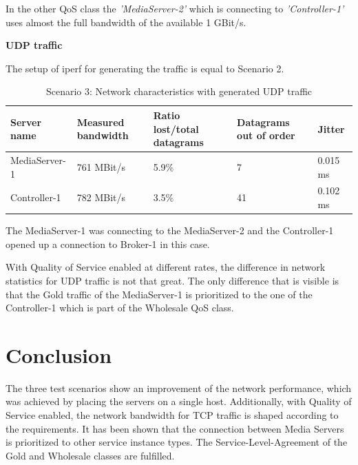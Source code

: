 In the other QoS class the \textit{'MediaServer-2'} which is connecting to \textit{'Controller-1'} uses almost the full bandwidth of the available 1 GBit/s.

\textbf{UDP traffic}

The setup of iperf for generating the traffic is equal to Scenario 2.

\begin{table}[H]
\centering

\begin{tabularx}{\textwidth}{ |X|X|X|X|X| }
\hline Server name & Measured bandwidth & Ratio lost/total datagrams & Datagrams out of order & Jitter \\ 
\hline MediaServer-1 & 761 MBit/s & 5.9\% & 7 & 0.015 ms\\ 
\hline Controller-1 & 782 MBit/s & 3.5\% & 41 & 0.102 ms \\ 
\hline 
\end{tabularx}

\caption{Scenario 3: Network characteristics with generated UDP traffic}
\end{table}

The MediaServer-1 was connecting to the MediaServer-2 and the Controller-1 opened up a connection to Broker-1 in this case.

With Quality of Service enabled at different rates, the difference in network statistics for UDP traffic is not that great. The only difference that is visible is that the Gold traffic of the MediaServer-1 is prioritized to the one of the Controller-1 which is part of the Wholesale QoS class.



\section{Conclusion}

The three test scenarios show an improvement of the network performance, which was achieved by placing the servers on a single host. Additionally, with Quality of Service enabled, the network bandwidth for TCP traffic is shaped according to the requirements. It has been shown that the connection between Media Servers is prioritized to other service instance types. The Service-Level-Agreement of the Gold and Wholesale classes are fulfilled.